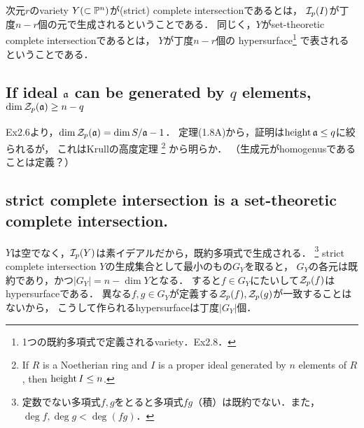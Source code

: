 \documentclass[a4paper]{jsarticle}
\begin{document}
\section{ } %
    次元$r$のvariety $Y (\subset \mathbb{P}^n)$が(strict) complete intersectionであるとは，
    $\mathcal{I}_p(I)$が丁度$n-r$個の元で生成されるということである．
    同じく，$Y$がset-theoretic complete intersectionであるとは，
    $Y$が丁度$n-r$個の
    hypersurface\footnote{1つの既約多項式で定義されるvariety．Ex2.8．}
    で表されるということである．

    \subsection{If ideal $\mathfrak{a}$ can be generated by $q$ elements, $\dim \mathcal{Z}_p(\mathfrak{a}) \geq n-q$}
    Ex2.6より，$\dim \mathcal{Z}_p(\mathfrak{a})=\dim S/\mathfrak{a}-1$．
    定理(1.8A)から，証明は$\operatorname{height} \mathfrak{a} \leq q$に絞られるが，
    これはKrullの高度定理
    \footnote{If $R$ is a Noetherian ring and $I$ is a proper ideal generated by $n$ elements of $R$, then $\operatorname{height} I \leq n$.}
    から明らか．
    （生成元がhomogenusであることは定義？）

    \subsection{strict complete intersection is a set-theoretic complete intersection.}
    $Y$は空でなく，$\mathcal{I}_p(Y)$は素イデアルだから，既約多項式で生成される．
    \footnote{定数でない多項式$f,g$をとると多項式$fg$（積）は既約でない．また，$\deg f, \deg g < \deg (fg)$．}
    strict complete intersection $Y$の生成集合として最小のもの$G_Y$を取ると，
    $G_Y$の各元は既約であり，かつ$|G_Y|=n-\dim Y$となる．
    すると$f \in G_Y$にたいして$\mathcal{Z}_p(f)$はhypersurfaceである．
    異なる$f,g \in G_Y$が定義する$\mathcal{Z}_p(f), \mathcal{Z}_p(g)$が一致することはないから，
    こうして作られるhypersurfaceは丁度$|G_Y|$個．
\end{document}
